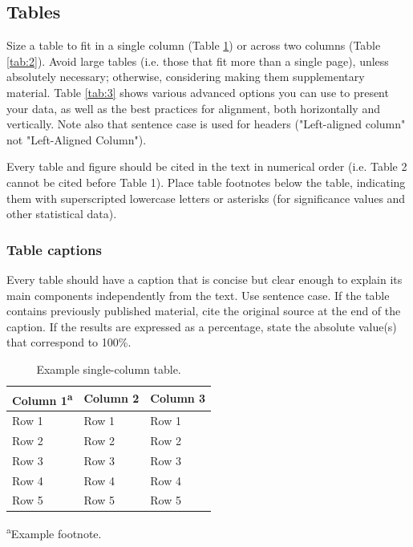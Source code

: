 \documentclass[twocolumn,twoside]{base/jrekpros}
\begin{document}
\subsection{Tables}

Size a table to fit in a single column (Table \ref{tab:1}) or across two columns (Table \ref{tab:2}). Avoid large tables (i.e. those that fit more than a single page), unless absolutely necessary; otherwise, considering making them supplementary material. Table \ref{tab:3} shows various advanced options you can use to present your data, as well as the best practices for alignment, both horizontally and vertically. Note also that sentence case is used for headers ("Left-aligned column" not "Left-Aligned Column").

Every table and figure should be cited in the text in numerical order (i.e. Table 2 cannot be cited before Table 1). Place table footnotes below the table, indicating them with superscripted lowercase letters or asterisks (for significance values and other statistical data).

\subsubsection{Table captions}

Every table should have a caption that is concise but clear enough to explain its main components independently from the text. Use sentence case. If the table contains previously published material, cite the original source at the end of the caption. If the results are expressed as a percentage, state the absolute value(s) that correspond to 100\%.

\begin{table}[b]
  	\centering\footnotesize\sffamily
  	\caption{Example single-column table.}
  	\begin{tableminipage}{\linewidth}
    	\begin{tabularx} {\linewidth}{XXX}
			\toprule
            Column 1\textsuperscript{a} & Column 2 & Column 3  \\            
	    	\midrule
            Row 1 & Row 1 & Row 1 \\
            Row 2 & Row 2 & Row 2 \\
            Row 3 & Row 3 & Row 3 \\
            Row 4 & Row 4 & Row 4 \\
            Row 5 & Row 5 & Row 5 \\
            \bottomrule
    	\end{tabularx}
        \label{tab:1}
        \vskip0pt
        \textsuperscript{a}Example footnote.
  	\end{tableminipage}
\end{table}
\end{document}
